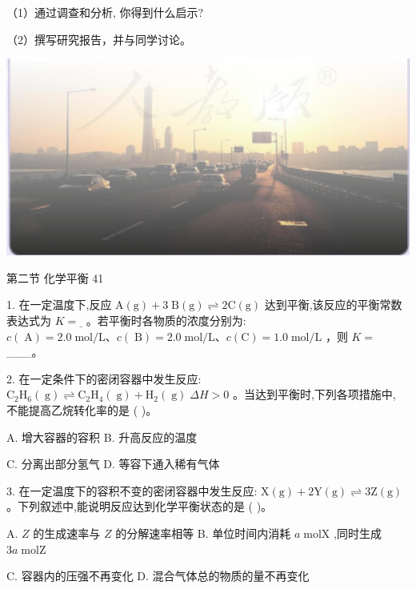 \documentclass[10pt]{article}
\begin{document}
（1）通过调查和分析, 你得到什么启示?

（2）撰写研究报告，并与同学讨论。

\begin{center}
\includegraphics[max width=1.0\textwidth]{images/0190da9d-8bfd-732f-bc2c-0b21d0f13b91_46_239513.jpg}
\end{center}

第二节 化学平衡 41

1. 在一定温度下,反应 \(\mathrm{A}\left( \mathrm{g}\right) + 3\mathrm{\;B}\left( \mathrm{g}\right) \rightleftharpoons 2\mathrm{C}\left( \mathrm{g}\right)\) 达到平衡,该反应的平衡常数表达式为 \(K = \underline{\;}\) 。若平衡时各物质的浓度分别为: \(c\left( \mathrm{\;A}\right) = {2.0}\mathrm{\;{mol}}/\mathrm{L}\text{、}c\left( \mathrm{\;B}\right) = {2.0}\mathrm{\;{mol}}/\mathrm{L}\text{、}c\left( \mathrm{C}\right) = {1.0}\mathrm{\;{mol}}/\mathrm{L}\) ，则 \(K =\) \_\_\_。

2. 在一定条件下的密闭容器中发生反应: \({\mathrm{C}}_{2}{\mathrm{H}}_{6}\left( \mathrm{\;g}\right) \rightleftharpoons {\mathrm{C}}_{2}{\mathrm{H}}_{4}\left( \mathrm{\;g}\right) + {\mathrm{H}}_{2}\left( \mathrm{\;g}\right) \;{\Delta H} > 0\) 。当达到平衡时,下列各项措施中, 不能提高乙烷转化率的是 ( )。

A. 增大容器的容积 B. 升高反应的温度

C. 分离出部分氢气 D. 等容下通入稀有气体

3. 在一定温度下的容积不变的密闭容器中发生反应: \(\mathrm{X}\left( \mathrm{g}\right) + 2\mathrm{Y}\left( \mathrm{g}\right) \rightleftharpoons 3\mathrm{Z}\left( \mathrm{g}\right)\) 。下列叙述中,能说明反应达到化学平衡状态的是 ( )。

A. \(Z\) 的生成速率与 \(Z\) 的分解速率相等 B. 单位时间内消耗 \(a\mathrm{\;{mol}}\mathrm{X}\) ,同时生成 \({3a}\mathrm{\;{mol}}\mathrm{Z}\)

C. 容器内的压强不再变化 D. 混合气体总的物质的量不再变化
\end{document}
